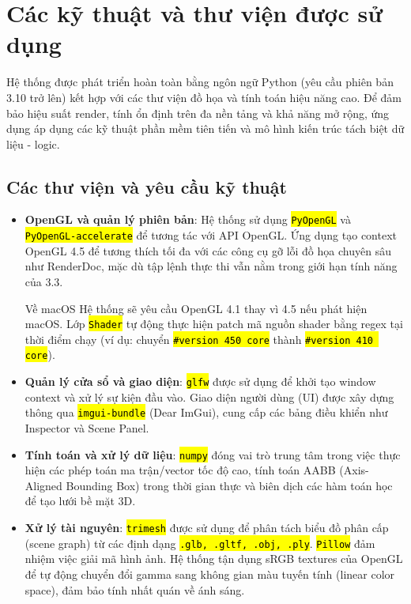 \documentclass[a4paper]{article}
\newcommand{\code}[1]{\hl{\texttt{#1}}}
\begin{document}
\section{Các kỹ thuật và thư viện được sử dụng}
\hspace{12pt}
Hệ thống được phát triển hoàn toàn bằng ngôn ngữ Python (yêu cầu phiên bản 3.10 trở lên) kết hợp với các thư viện đồ họa và tính toán hiệu năng cao. Để đảm bảo hiệu suất render, tính ổn định trên đa nền tảng và khả năng mở rộng, ứng dụng áp dụng các kỹ thuật phần mềm tiên tiến và mô hình kiến trúc tách biệt dữ liệu - logic.

\subsection{Các thư viện và yêu cầu kỹ thuật}
\hspace{12pt}
\begin{itemize}
    \item \textbf{OpenGL và quản lý phiên bản}: 
    Hệ thống sử dụng \code{PyOpenGL} và \code{PyOpenGL-accelerate} để tương tác với API OpenGL. Ứng dụng tạo context OpenGL 4.5 để tương thích tối đa với các công cụ gỡ lỗi đồ họa chuyên sâu như RenderDoc, mặc dù tập lệnh thực thi vẫn nằm trong giới hạn tính năng của 3.3.
    \begin{myremark}{Về macOS}
    Hệ thống sẽ yêu cầu OpenGL 4.1 thay vì 4.5 nếu phát hiện macOS. Lớp \code{Shader} tự động thực hiện patch mã nguồn shader bằng regex tại thời điểm chạy (ví dụ: chuyển \code{\#version 450 core} thành \code{\#version 410 core}).
    \end{myremark}

    \item \textbf{Quản lý cửa sổ và giao diện}: \code{glfw} được sử dụng để khởi tạo window context và xử lý sự kiện đầu vào. Giao diện người dùng (UI) được xây dựng thông qua \code{imgui-bundle} (Dear ImGui), cung cấp các bảng điều khiển như Inspector và Scene Panel.

    \item \textbf{Tính toán và xử lý dữ liệu}: \code{numpy} đóng vai trò trung tâm trong việc thực hiện các phép toán ma trận/vector tốc độ cao, tính toán AABB (Axis-Aligned Bounding Box) trong thời gian thực và biên dịch các hàm toán học để tạo lưới bề mặt 3D.

    \item \textbf{Xử lý tài nguyên}: \code{trimesh} được sử dụng để phân tách biểu đồ phân cấp (scene graph) từ các định dạng \code{.glb, .gltf, .obj, .ply}. \code{Pillow} đảm nhiệm việc giải mã hình ảnh. Hệ thống tận dụng sRGB textures của OpenGL để tự động chuyển đổi gamma sang không gian màu tuyến tính (linear color space), đảm bảo tính nhất quán về ánh sáng.
\end{itemize}
\end{document}
